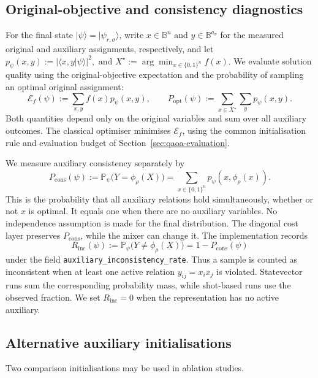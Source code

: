\documentclass[a4paper,onecolumn,11pt,unpublished]{quantumarticle}
\theoremstyle{remark}
\begin{document}
\subsection{Original-objective and consistency diagnostics}
For the final state $|\psi\rangle=|\psi_{r,\sigma}\rangle$, write
$x\in\mathbb B^n$ and $y\in\mathbb B^{a_\sigma}$ for the measured original
and auxiliary assignments, respectively, and let
\(
p_\psi(x,y):=|\langle x,y|\psi\rangle|^2,
\text{ and }
X^\star:=\arg\min_{x\in\{0,1\}^n}f(x).
\)
We evaluate solution quality using the original-objective expectation
and the probability of sampling an optimal original assignment:
\[
\mathcal E_f(\psi):=\sum_{x,y}f(x)p_\psi(x,y),
\qquad
P_{\mathrm{opt}}(\psi):=\sum_{x\in X^\star}\sum_y p_\psi(x,y).
\]
Both quantities depend only on the original variables and sum over
all auxiliary outcomes. The classical optimiser minimises
$\mathcal E_f$, using the common initialisation rule and evaluation
budget of Section~\ref{sec:qaoa-evaluation}.

We measure auxiliary consistency separately by
\begin{equation}
P_{\mathrm{cons}}(\psi)
:=\mathbb P_\psi\!\bigl(Y=\phi_\rho(X)\bigr)
=\sum_{x\in\{0,1\}^n}p_\psi(x,\phi_\rho(x)).
\label{eq:pcons}
\end{equation}
This is the probability that all auxiliary relations hold
simultaneously, whether or not $x$ is optimal. It equals one when
there are no auxiliary variables. No independence assumption is
made for the final distribution. The diagonal cost layer preserves
$P_{\mathrm{cons}}$, while the mixer can change it.  The implementation
records
\begin{equation}
R_{\mathrm{inc}}(\psi)
:=\mathbb P_\psi\!\bigl(Y\neq\phi_\rho(X)\bigr)
=1-P_{\mathrm{cons}}(\psi)
\label{eq:rinc}
\end{equation}
under the field \nolinkurl{auxiliary_inconsistency_rate}.  Thus a sample
is counted as inconsistent when at least one active relation
$y_{ij}=x_i x_j$ is violated.  Statevector runs sum the corresponding
probability mass, while shot-based runs use the observed fraction.  We set
$R_{\mathrm{inc}}=0$ when the representation has no active auxiliary.

\subsection{Alternative auxiliary initialisations}
\label{app:alternative-warm-starts}

Two comparison initialisations may be used in ablation studies.
\end{document}
